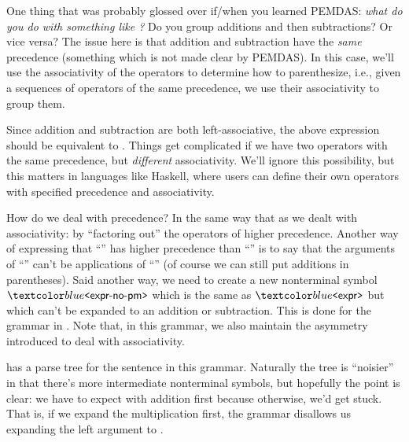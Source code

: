 \begin{remark}
  \label{rmk:diff-assoc}
  One thing that was probably glossed over if/when you learned PEMDAS:
  \textit{what do you do with something like ?}
  Do you group additions and then subtractions?
  Or vice versa?
  The issue here is that addition and subtraction have the \textit{same} precedence (something which is not made clear by PEMDAS).
  In this case, we'll use the associativity of the operators to determine how to parenthesize, i.e., given a sequences of operators of the same precedence, we use their associativity to group them.

  Since addition and subtraction are both left-associative, the above expression should be equivalent to .
  Things get complicated if we have two operators with the same precedence, but \textit{different} associativity.
  We'll ignore this possibility, but this matters in languages like Haskell, where users can define their own operators with specified precedence and associativity.
\end{remark}
%
How do we deal with precedence?
In the same way that as we dealt with associativity: by \enquote{factoring out} the operators of higher precedence.
Another way of expressing that \enquote{\codel{*}} has higher precedence than \enquote{\codel{+}} is to say that the arguments of \enquote{\codel{*}} can't be applications of \enquote{\codel{+}} (of course we can still put additions in parentheses).
Said another way, we need to create a new nonterminal symbol $\bnfnt{expr-no-pm}$ which is the same as $\bnfnt{expr}$ but which can't be expanded to an addition or subtraction.
This is done for the grammar in .
Note that, in this grammar, we also maintain the asymmetry introduced to deal with associativity.

 has a parse tree for the sentence  in this grammar.
Naturally the tree is \enquote{noisier} in that there's more intermediate nonterminal symbols, but hopefully the point is clear: we have to expect with addition first because otherwise, we'd get stuck.
That is, if we expand the multiplication first, the grammar disallows us expanding the left argument to .

